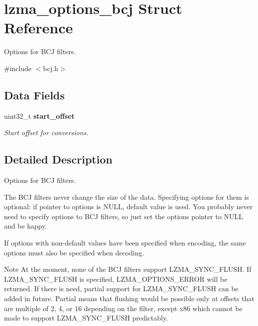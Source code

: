 \section{lzma\+\_\+options\+\_\+bcj Struct Reference}
\label{structlzma__options__bcj}


Options for B\+CJ filters.  




{\ttfamily \#include $<$bcj.\+h$>$}

\subsection*{Data Fields}
\begin{DoxyCompactItemize}
\item 
uint32\+\_\+t \textbf{ start\+\_\+offset}
\begin{DoxyCompactList}\small\item\em Start offset for conversions. \end{DoxyCompactList}\end{DoxyCompactItemize}


\subsection{Detailed Description}
Options for B\+CJ filters. 

The B\+CJ filters never change the size of the data. Specifying options for them is optional\+: if pointer to options is N\+U\+LL, default value is used. You probably never need to specify options to B\+CJ filters, so just set the options pointer to N\+U\+LL and be happy.

If options with non-\/default values have been specified when encoding, the same options must also be specified when decoding.

\begin{DoxyNote}{Note}
At the moment, none of the B\+CJ filters support L\+Z\+M\+A\+\_\+\+S\+Y\+N\+C\+\_\+\+F\+L\+U\+SH. If L\+Z\+M\+A\+\_\+\+S\+Y\+N\+C\+\_\+\+F\+L\+U\+SH is specified, L\+Z\+M\+A\+\_\+\+O\+P\+T\+I\+O\+N\+S\+\_\+\+E\+R\+R\+OR will be returned. If there is need, partial support for L\+Z\+M\+A\+\_\+\+S\+Y\+N\+C\+\_\+\+F\+L\+U\+SH can be added in future. Partial means that flushing would be possible only at offsets that are multiple of 2, 4, or 16 depending on the filter, except x86 which cannot be made to support L\+Z\+M\+A\+\_\+\+S\+Y\+N\+C\+\_\+\+F\+L\+U\+SH predictably. 
\end{DoxyNote}


